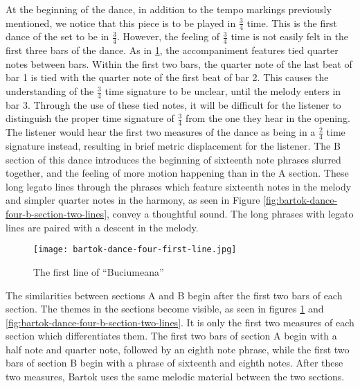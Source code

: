 At the beginning of the dance, in addition to the tempo markings previously mentioned, we notice that this piece is to be played in $\frac{3}{4}$ time. This is the first dance of the set to be in $\frac{3}{4}$. However, the feeling of $\frac{3}{4}$ time is not easily felt in the first three bars of the dance. As in \ref{fig:bartok-dance-four-first-line}\autocite{Lung_2016}, the accompaniment features tied quarter notes between bars. Within the first two bars, the quarter note of the last beat of bar 1 is tied with the quarter note of the first beat of bar 2. This causes the understanding of the $\frac{3}{4}$ time signature to be unclear, until the melody enters in bar 3. Through the use of these tied notes, it will be difficult for the listener to distinguish the proper time signature of $\frac{3}{4}$ from the one they hear in the opening. The listener would hear the first two measures of the dance as being in a $\frac{2}{4}$ time signature instead, resulting in brief metric displacement for the listener. The B section of this dance introduces the beginning of sixteenth note phrases slurred together, and the feeling of more motion happening than in the A section. These long legato lines through the phrases which feature sixteenth notes in the melody and simpler quarter notes in the harmony, as seen in Figure \ref{fig:bartok-dance-four-b-section-two-lines}\autocite{Lung_2016}, convey a thoughtful sound. The long phrases with legato lines are paired with a descent in the melody. 

\begin{figure}[h]
  \centering
  \texttt{[image: bartok-dance-four-first-line.jpg]}
  \caption[The first line of ``Buciumeana'' of Bartok's \textit{Romanian Folk Dances}, Sz. 56, BB 68]{The first line of ``Buciumeana''}
  \label{fig:bartok-dance-four-first-line}
\end{figure}


The similarities between sections A and B begin after the first two bars of each section. The themes in the sections become visible, as seen in figures \ref{fig:bartok-dance-four-first-line}\autocite{Lung_2016} and \ref{fig:bartok-dance-four-b-section-two-lines}\autocite{Lung_2016}. It is only the first two measures of each section which differentiates them. The first two bars of section A begin with a half note and quarter note, followed by an eighth note phrase, while the first two bars of section B begin with a phrase of sixteenth and eighth notes. After these two measures, Bartok uses the same melodic material between the two sections. 

